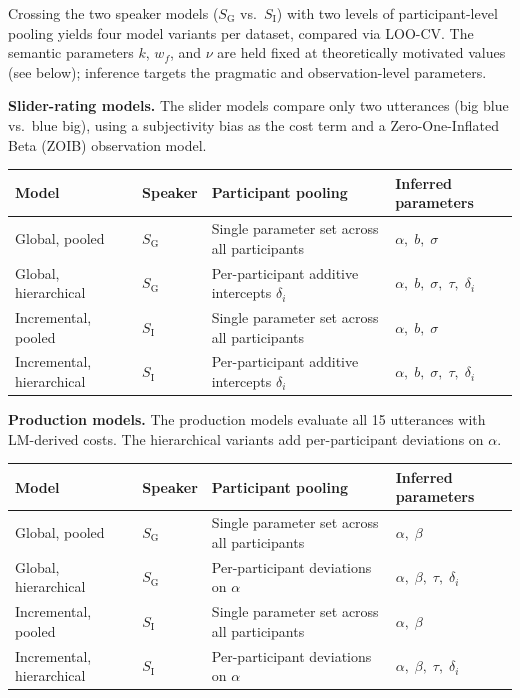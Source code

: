 \documentclass[11pt, a4paper]{article}
\newcommand{\utter}[1]{\textsf{#1}} %
\begin{document}
Crossing the two speaker models ($S_\text{G}$ vs.\ $S_\text{I}$) with two levels of participant-level pooling yields four model variants per dataset, compared via LOO-CV.  The semantic parameters $k$, $w_f$, and $\nu$ are held fixed at theoretically motivated values (see below); inference targets the pragmatic and observation-level parameters.

\medskip\noindent\textbf{Slider-rating models.}
The slider models compare only two utterances (\utter{big blue} vs.\ \utter{blue big}), using a subjectivity bias as the cost term and a Zero-One-Inflated Beta (ZOIB) observation model.

\begin{center}
\begin{tabularx}{\textwidth}{llXl}
\toprule
\textbf{Model} & \textbf{Speaker} & \textbf{Participant pooling} & \textbf{Inferred parameters} \\
\midrule
Global, pooled        & $S_\text{G}$ & Single parameter set across all participants & $\alpha,\; b,\; \sigma$ \\[2pt]
Global, hierarchical  & $S_\text{G}$ & Per-participant additive intercepts $\delta_i$ & $\alpha,\; b,\; \sigma,\; \tau,\; \delta_i$ \\[2pt]
Incremental, pooled       & $S_\text{I}$ & Single parameter set across all participants & $\alpha,\; b,\; \sigma$ \\[2pt]
Incremental, hierarchical & $S_\text{I}$ & Per-participant additive intercepts $\delta_i$ & $\alpha,\; b,\; \sigma,\; \tau,\; \delta_i$ \\
\bottomrule
\end{tabularx}
\end{center}

\medskip\noindent\textbf{Production models.}
The production models evaluate all 15 utterances with LM-derived costs.  The hierarchical variants add per-participant deviations on $\alpha$.

\begin{center}
\begin{tabularx}{\textwidth}{llXl}
\toprule
\textbf{Model} & \textbf{Speaker} & \textbf{Participant pooling} & \textbf{Inferred parameters} \\
\midrule
Global, pooled        & $S_\text{G}$ & Single parameter set across all participants & $\alpha,\; \beta$ \\[2pt]
Global, hierarchical  & $S_\text{G}$ & Per-participant deviations on $\alpha$ & $\alpha,\; \beta,\; \tau,\; \delta_i$ \\[2pt]
Incremental, pooled       & $S_\text{I}$ & Single parameter set across all participants & $\alpha,\; \beta$ \\[2pt]
Incremental, hierarchical & $S_\text{I}$ & Per-participant deviations on $\alpha$ & $\alpha,\; \beta,\; \tau,\; \delta_i$ \\
\bottomrule
\end{tabularx}
\end{center}
\end{document}
